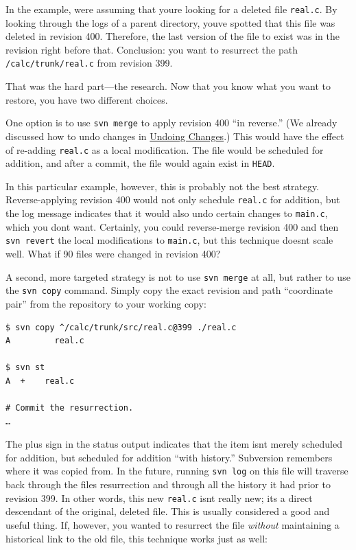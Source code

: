 In the example, we\textquotesingle re assuming that
you\textquotesingle re looking for a deleted file \texttt{real.c}. By
looking through the logs of a parent directory, you\textquotesingle ve
spotted that this file was deleted in revision 400. Therefore, the last
version of the file to exist was in the revision right before that.
Conclusion: you want to resurrect the path \texttt{/calc/trunk/real.c}
from revision 399.

That was the hard part---the research. Now that you know what you want
to restore, you have two different choices.

One option is to use \texttt{svn\ merge} to apply revision 400 ``in
reverse.'' (We already discussed how to undo changes in
\hyperref[svn.branchmerge.basicmerging.undo]{Undoing Changes}.) This
would have the effect of re-adding \texttt{real.c} as a local
modification. The file would be scheduled for addition, and after a
commit, the file would again exist in \texttt{HEAD}.

In this particular example, however, this is probably not the best
strategy. Reverse-applying revision 400 would not only schedule
\texttt{real.c} for addition, but the log message indicates that it
would also undo certain changes to \texttt{main.c}, which you
don\textquotesingle t want. Certainly, you could reverse-merge revision
400 and then \texttt{svn\ revert} the local modifications to
\texttt{main.c}, but this technique doesn\textquotesingle t scale well.
What if 90 files were changed in revision 400?

A second, more targeted strategy is not to use \texttt{svn\ merge} at
all, but rather to use the \texttt{svn\ copy} command. Simply copy the
exact revision and path ``coordinate pair'' from the repository to your
working copy:

\begin{verbatim}
$ svn copy ^/calc/trunk/src/real.c@399 ./real.c
A         real.c

$ svn st
A  +    real.c

# Commit the resurrection.
…
\end{verbatim}

The plus sign in the status output indicates that the item
isn\textquotesingle t merely scheduled for addition, but scheduled for
addition ``with history.'' Subversion remembers where it was copied
from. In the future, running \texttt{svn\ log} on this file will
traverse back through the file\textquotesingle s resurrection and
through all the history it had prior to revision 399. In other words,
this new \texttt{real.c} isn\textquotesingle t really new;
it\textquotesingle s a direct descendant of the original, deleted file.
This is usually considered a good and useful thing. If, however, you
wanted to resurrect the file \emph{without} maintaining a historical
link to the old file, this technique works just as well:

